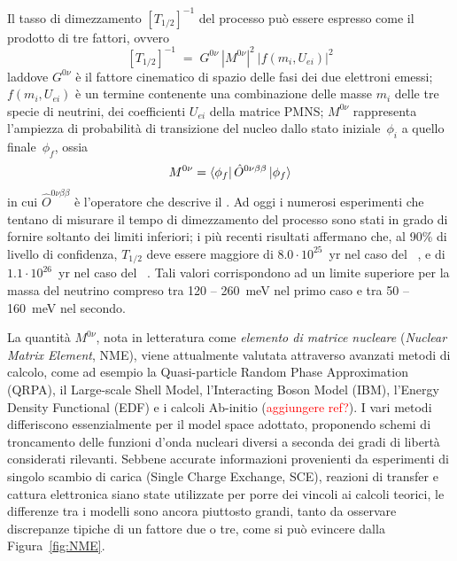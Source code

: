 Il tasso di dimezzamento $ \left[ T_{1/2} \right]^{-1} $ del processo \doppiobeta{} può essere espresso come il prodotto di tre fattori, ovvero
\begin{equation} \label{eq:rate_doppio_beta}
	\left[ T_{1/2} \right]^{-1} \; = \; G^{0 \nu} \: \left| M^{0 \nu} \right|^2 \: \left| f ( m_i, U_{ei}) \right|^2 
\end{equation}
laddove $G^{0 \nu}$ è il fattore cinematico di spazio delle fasi dei due elettroni emessi; $ f ( m_i, U_{ei}) $ è un termine contenente una combinazione delle masse $m_i$ delle tre specie di neutrini, dei coefficienti $U_{ei}$ della matrice PMNS; $M^{0 \nu}$ rappresenta l'ampiezza di probabilità di transizione del nucleo dallo stato iniziale~$\phi_i$ a quello finale~$\phi_f$, ossia
\begin{equation}
	M^{0 \nu} = \bra{\phi_f} \hat{O}^{0 \nu \beta \beta} \ket{\phi_f} 
\end{equation}
in cui $\hat{O}^{0 \nu \beta \beta}$ è l'operatore che descrive il \doppiobeta{}. 
Ad oggi i numerosi esperimenti che tentano di misurare il tempo di dimezzamento del processo sono stati in grado di fornire soltanto dei limiti inferiori; i più recenti risultati affermano che, al 90\% di livello di confidenza, $T_{1/2}$ deve essere maggiore di $8.0 \cdot 10^{25}$~yr nel caso del ~\cite{agostini:prl18}, e di $1.1 \cdot 10^{26}$~yr nel caso del ~\cite{gando:prl16}. Tali valori corrispondono ad un limite superiore per la massa del neutrino compreso tra 120 -- 260~meV nel primo caso e tra 50 -- 160~meV nel secondo.




La quantità $M^{0 \nu}$, nota in letteratura come \emph{elemento di matrice nucleare} (\emph{Nuclear Matrix Element}, NME), viene attualmente valutata attraverso avanzati metodi di calcolo, come ad esempio la Quasi-particle Random Phase Approximation (QRPA), il Large-scale Shell Model, l'Interacting Boson Model (IBM), l'Energy Density Functional (EDF) e i calcoli Ab-initio (\textcolor{red}{aggiungere ref?}). I vari metodi differiscono essenzialmente per il model space adottato, proponendo schemi di troncamento delle funzioni d'onda nucleari diversi a seconda dei gradi di libertà considerati rilevanti. 
Sebbene accurate informazioni provenienti da esperimenti di singolo scambio di carica (Single Charge Exchange, SCE), reazioni di transfer e cattura elettronica siano state utilizzate per porre dei vincoli ai calcoli teorici, le differenze tra i modelli sono ancora piuttosto grandi, tanto da osservare discrepanze tipiche di un fattore due o tre, come si può evincere dalla Figura~\ref{fig:NME}. 

